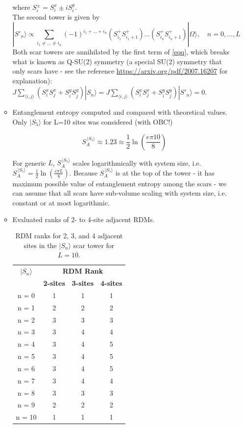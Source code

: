 \documentclass[11pt]{article}
\begin{document}
\begin{itemize}
\begin{itemize}
	where $S_i^\pm = S_i^x \pm i S_i^y$.\\
     The second tower is given by 
     \begin{equation}
	|S'_n\rangle \propto \sum_{i_1 \neq \hdots \neq i_n} (-1)^{i_1 + \hdots + i_n} \left(S^+_{i_1}S^+_{i_1+1}\right)\hdots\left(S^+_{i_n}S^+_{i_n+1}\right)  |\Omega\rangle, \quad n = 0,\hdots,L
	\end{equation}
	Both scar towers are annihilated by the first term of \eqref{eqq}, which breaks what is known as Q-SU(2) symmetry (a special SU(2) symmetry that only scars have - see the reference \href{https://arxiv.org/pdf/2007.16207}{https://arxiv.org/pdf/2007.16207} for explanation): $J \sum_{\langle i,j \rangle} \left( S^x_i S^x_j + S^y_i S^y_j \right)  |S_n\rangle = J \sum_{\langle i,j \rangle} \left( S^x_i S^x_j + S^y_i S^y_j \right)  |S'_n\rangle = 0$.
        \item Entanglement entropy computed and compared with theoretical values.
        Only $|S_5\rangle$ for L=10 sites was considered (with OBC!)
        
         \begin{equation}
        S^{\,|S_5\rangle}_A \approx 1.23 \approx \frac{1}{2} \ln \left(\frac{e \pi 10}{8}\right)
        \end{equation}
        
        For generic $L$, $S^{\,|S_5\rangle}_A$ scales logarithmically with system size, i.e. $S^{\,|S_5\rangle}_A = \frac{1}{2} \ln \left(\frac{e \pi L}{8}\right)$. Because $S^{\,|S_5\rangle}_A$ is at the top of the tower - it has maximum possible 						value of entanglement entropy among the scars - we can assume that all scars have sub-volume scaling with system size, i.e. constant or at most logarithmic.
        
        \item Evaluated ranks of 2- to 4-site adjacent RDMs.
         \begin{table}[H]
	\centering
	\begin{tabular}{|c|ccc|}
	\hline
	\textbf{$|S_n\rangle$} & \multicolumn{3}{c|}{\textbf{RDM Rank}} \\
	\cline{2-4}
	& \textbf{2-sites} & \textbf{3-sites} & \textbf{4-sites}\\
	\hline
	 n = 0 & 1 & 1 & 1 \\
	 n = 1 & 2 & 2 & 2 \\
	 n = 2 & 3 & 3 & 3 \\
	 n = 3 & 3 & 4 & 4 \\
	 n = 4 & 3 & 4 & 5 \\  
	 n = 5 & 3 & 4 & 5 \\
	 n = 6 & 3 & 4 & 5 \\
	 n = 7 & 3 & 4 & 4 \\
	 n = 8 & 3 & 3 & 3 \\
	 n = 9 & 2 & 2 & 2 \\
	 n = 10 & 1 & 1 & 1 \\
	\hline
	\end{tabular}
	\caption{RDM ranks for 2, 3, and 4 adjacent sites in the $|S_n\rangle$ scar tower for $L=10$.}
	\label{tab:ranks21}
	\end{table}


\end{itemize}
\end{itemize}
\end{document}
